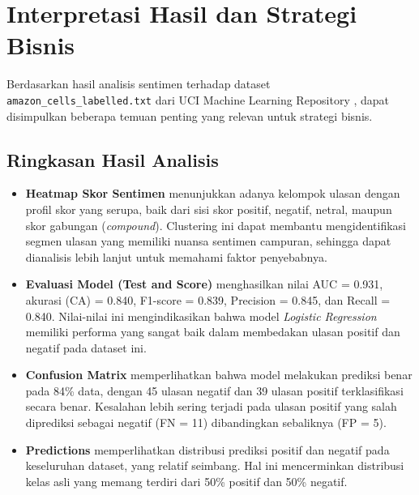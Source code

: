 \section{Interpretasi Hasil dan Strategi Bisnis}

Berdasarkan hasil analisis sentimen terhadap dataset \texttt{amazon\_cells\_labelled.txt} dari UCI Machine Learning Repository \cite{kotzias2015sentiment}, dapat disimpulkan beberapa temuan penting yang relevan untuk strategi bisnis.

\subsection*{Ringkasan Hasil Analisis}
\begin{itemize}
	\item \textbf{Heatmap Skor Sentimen} menunjukkan adanya kelompok ulasan dengan profil skor yang serupa, baik dari sisi skor positif, negatif, netral, maupun skor gabungan (\textit{compound}). Clustering ini dapat membantu mengidentifikasi segmen ulasan yang memiliki nuansa sentimen campuran, sehingga dapat dianalisis lebih lanjut untuk memahami faktor penyebabnya.
	\item \textbf{Evaluasi Model (Test and Score)} menghasilkan nilai AUC = 0.931, akurasi (CA) = 0.840, F1-score = 0.839, Precision = 0.845, dan Recall = 0.840. Nilai-nilai ini mengindikasikan bahwa model \textit{Logistic Regression} memiliki performa yang sangat baik dalam membedakan ulasan positif dan negatif pada dataset ini.
	\item \textbf{Confusion Matrix} memperlihatkan bahwa model melakukan prediksi benar pada 84\% data, dengan 45 ulasan negatif dan 39 ulasan positif terklasifikasi secara benar. Kesalahan lebih sering terjadi pada ulasan positif yang salah diprediksi sebagai negatif (FN = 11) dibandingkan sebaliknya (FP = 5).
	\item \textbf{Predictions} memperlihatkan distribusi prediksi positif dan negatif pada keseluruhan dataset, yang relatif seimbang. Hal ini mencerminkan distribusi kelas asli yang memang terdiri dari 50\% positif dan 50\% negatif.
\end{itemize}

